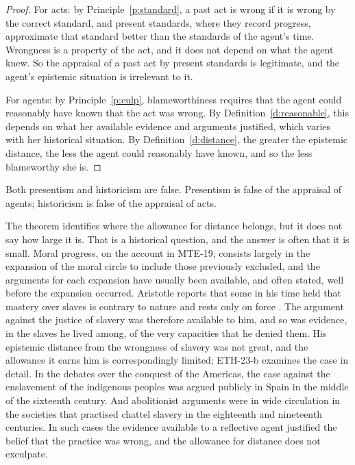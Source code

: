 \documentclass{situationist-preprint}
\begin{document}
\begin{proof}
For acts: by Principle~\ref{p:standard}, a past act is wrong if it is wrong by the correct standard, and present standards, where they record progress, approximate that standard better than the standards of the agent's time. Wrongness is a property of the act, and it does not depend on what the agent knew. So the appraisal of a past act by present standards is legitimate, and the agent's epistemic situation is irrelevant to it.

For agents: by Principle~\ref{p:culp}, blameworthiness requires that the agent could reasonably have known that the act was wrong. By Definition~\ref{d:reasonable}, this depends on what her available evidence and arguments justified, which varies with her historical situation. By Definition~\ref{d:distance}, the greater the epistemic distance, the less the agent could reasonably have known, and so the less blameworthy she is.
\end{proof}

\begin{corollary}\label{c:neither}
Both presentism and historicism are false. Presentism is false of the appraisal of agents; historicism is false of the appraisal of acts.
\end{corollary}

The theorem identifies where the allowance for distance belongs, but it does not say how large it is. That is a historical question, and the answer is often that it is small. Moral progress, on the account in MTE-19, consists largely in the expansion of the moral circle to include those previously excluded, and the arguments for each expansion have usually been available, and often stated, well before the expansion occurred. Aristotle reports that some in his time held that mastery over slaves is contrary to nature and rests only on force \citep[I.3, I.6]{AristotlePol}. The argument against the justice of slavery was therefore available to him, and so was evidence, in the slaves he lived among, of the very capacities that he denied them. His epistemic distance from the wrongness of slavery was not great, and the allowance it earns him is correspondingly limited; ETH-23-b examines the case in detail. In the debates over the conquest of the Americas, the case against the enslavement of the indigenous peoples was argued publicly in Spain in the middle of the sixteenth century. And abolitionist arguments were in wide circulation in the societies that practised chattel slavery in the eighteenth and nineteenth centuries. In such cases the evidence available to a reflective agent justified the belief that the practice was wrong, and the allowance for distance does not exculpate.
\end{document}
